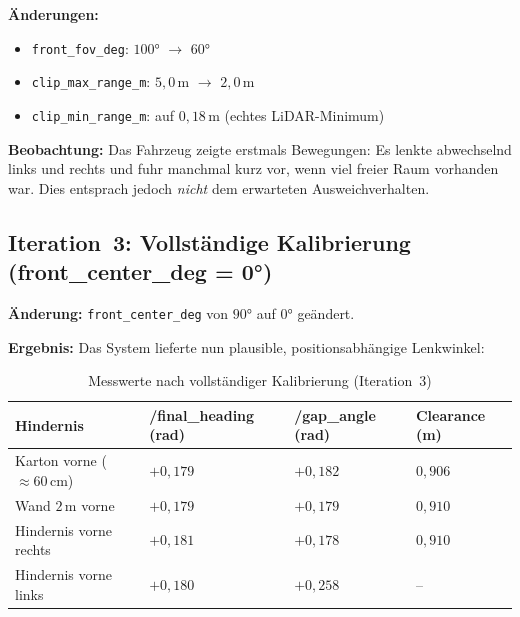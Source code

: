 \textbf{Änderungen:}
\begin{itemize}
    \item \texttt{front\_fov\_deg}: $100°$ $\to$ $60°$
    \item \texttt{clip\_max\_range\_m}: $5{,}0$\,m $\to$ $2{,}0$\,m
    \item \texttt{clip\_min\_range\_m}: auf $0{,}18$\,m (echtes LiDAR-Minimum)
\end{itemize}

\textbf{Beobachtung:} Das Fahrzeug zeigte erstmals Bewegungen:
Es lenkte abwechselnd links und rechts und fuhr manchmal kurz vor,
wenn viel freier Raum vorhanden war. Dies entsprach jedoch
\emph{nicht} dem erwarteten Ausweichverhalten.


\subsection{Iteration~3: Vollständige Kalibrierung (front\_center\_deg = 0°)}

\textbf{Änderung:} \texttt{front\_center\_deg} von $90°$ auf $0°$ geändert.

\textbf{Ergebnis:} Das System lieferte nun plausible, positionsabhängige
Lenkwinkel:

\begin{table}[H]
\centering
\caption{Messwerte nach vollständiger Kalibrierung (Iteration~3)}
\label{tab:iter3}
\begin{tabular}{llll}
\toprule
\textbf{Hindernis} & \textbf{/final\_heading (rad)} & \textbf{/gap\_angle (rad)} & \textbf{Clearance (m)} \\
\midrule
Karton vorne ($\approx 60$\,cm)   & $+0{,}179$ & $+0{,}182$ & $0{,}906$ \\
Wand $2$\,m vorne                & $+0{,}179$ & $+0{,}179$ & $0{,}910$ \\
Hindernis vorne rechts           & $+0{,}181$ & $+0{,}178$ & $0{,}910$ \\
Hindernis vorne links            & $+0{,}180$ & $+0{,}258$ & --        \\
\bottomrule
\end{tabular}
\end{table}


